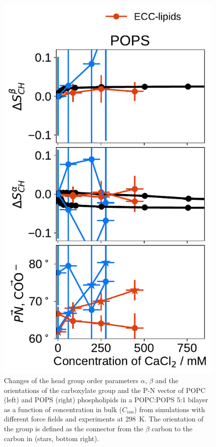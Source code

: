 \begin{figure}[tbp!]
  \includegraphics[width=\figwidthsmall]{../img/ecc_pops/order_parameters_changes_ecc-lip_L14_A-B-PN-COO_POPS_cacl.pdf} 
  \caption{\label{fig:delta_ordPar_CaCl_PCPS} 
    Changes of the head group order parameters $\alpha$, $\beta$ and the orientations of the carboxylate group and the P-N vector  
    of POPC (left) and POPS (right) phospholipids in a POPC:POPS 5:1 bilayer as a function of  concentration 
    in bulk ($C_{ion}$) from simulations with different force fields and experiments at 298~K. \citep{roux90}
    The orientation of the  group is defined as 
    the connector from the $\beta$ carbon to the carbon in  (stars, bottom right). 
  } 
\end{figure} 



